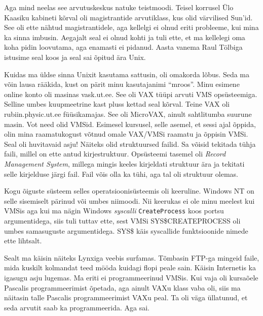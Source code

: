 Aga mind neelas see arvutuskeskus natuke teistmoodi. Teisel korrusel Ülo
Kaasiku kabineti kõrval oli magistrantide arvutiklass,
kus olid värvilised Sun'id. See oli ette nähtud magistrantidele, aga kellelgi
ei olnud eriti probleeme, kui mina ka sinna imbusin. Aegajalt seal ei olnud
kohti ja tuli ette, et ma kellelegi oma koha pidin loovutama, aga enamasti ei
pidanud. Aasta vanema Raul Tölbiga istusime seal koos ja
seal sai õpitud ära Unix.

Kuidas ma üldse sinna Unixit kasutama sattusin, oli omakorda lõbus. Seda ma
võin lausa rääkida, kust on pärit minu kasutajanimi \enquote{mroos}. Minu
esimene online konto oli masinas vask.ut.ee. See oli
VAX tüüpi arvuti
VMS opsüsteemiga.
Selline umbes kuupmeetrine kast pluss kettad seal kõrval. Teine VAX oli
rubiin.physic.ut.ee füüsikamajas. See oli
MicroVAX, ainult sahtlitumba suurune masin. Vot need olid VMSid. Esimesel
kursusel, selle asemel, et sessi ajal õppida, olin mina raamatukogust võtnud
omale VAX/VMSi raamatu ja õppisin VMSi. Seal oli huvitavaid asju! Näiteks olid
struktuursed failid. Sa võisid tekitada tühja faili, millel on ette antud
kirjestruktuur. Opsüsteemi tasemel oli \emph{Record Management System}, millega
mingis keeles kirjeldati struktuur ära ja tekitati selle kirjelduse järgi fail.
Fail võis olla ka tühi, aga tal oli struktuur olemas.

Kogu õiguste süsteem selles operatsioonisüsteemis oli keeruline. Windows
NT on selle sisemiselt pärinud või umbes niimoodi. Nii
keerukas ei ole minu meelest kui VMSis aga kui ma nägin Windows \emph{syscalli}
\verb|CreateProcess| koos portsu argumentidega, siis tuli tuttav ette, sest
VMSi SYS\$CREATEPROCESS oli umbes samasuguste argumentidega. SYS\$ käis
syscallide funktsioonide nimede ette lihtsalt.

Sealt ma käisin näiteks Lynxiga veebis surfamas. Tõmbasin FTP-ga mingeid faile,
mida kuskilt kolmandat teed mööda kuidagi flopi peale sain. Käisin Internetis
ka igasugu asju lugemas. Ma eriti ei programmeerinud VMSis. Kui vaja oli
kursaõele Pascalis programmeerimist õpetada, aga ainult VAXu klass vaba oli,
siis ma näitasin talle Pascalis programmeerimist VAXu peal. Ta oli väga
üllatunud, et seda arvutit saab ka programmeerida. Aga sai.

